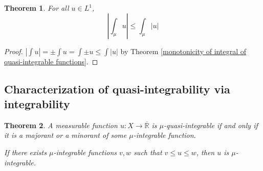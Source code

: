 \documentclass[11pt, a4paper, openany]{book}
\newtheorem{thm}{Theorem}\newtheorem{lem}{Lemma}\newtheorem{crl}{Corollary}
\theoremstyle{definition}
\newcommand{\er}{\overline{\mathbb{R}}}
\begin{document}
    \begin{thm}\label{triangle inequality 1}
        For all $u\in L^1$,
        \[
            \left|\int_\mu u\right|\leqslant \int_\mu |u|
        \]
    \end{thm}
    \begin{proof}
        $|\int  u|=\pm\int u=\int \pm u\leqslant \int |u|$ by Theorem \ref{monotonicity of integral of quasi-integrable functions}.
    \end{proof}
\subsection{Characterization of quasi-integrability via integrability}
    \begin{thm}\label{characetrization of quasi-integrable functions}
        A measurable function $u:X\rightarrow \er$ is $\mu$-quasi-integrable if and only if it is a majorant or a minorant of some $\mu$-integrable function.

        If there exists $\mu$-integrable functions $v,w$ such that $v\leqslant u\leqslant w$, then $u$ is $\mu$-integrable.
    \end{thm}
        
\end{document}
